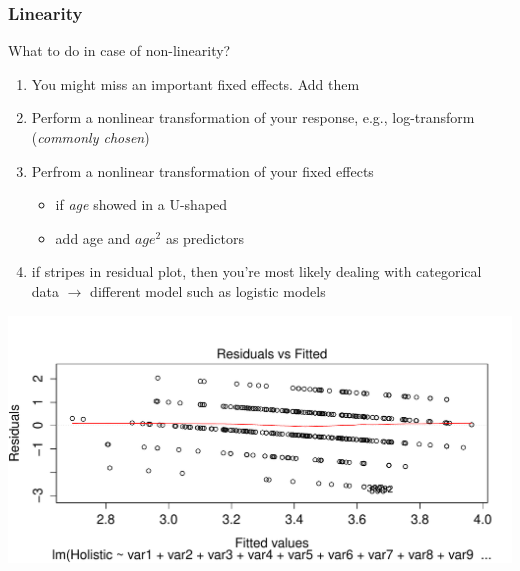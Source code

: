 \documentclass[10p]{beamer}\usepackage[]{graphicx}\usepackage[]{color}
\begin{document}
\begin{frame}
\frametitle{Linearity}
What to do in case of non-linearity?
\begin{enumerate}
\item You might miss an important fixed effects. Add them
\item Perform a \alert{nonlinear transformation} of your response, e.g., log-transform (\textit{commonly chosen})
\item Perfrom a nonlinear transformation of your fixed effects
	\begin{itemize}
	\item if \textit{age} showed in a U-shaped
	\item add age and $age^2$ as predictors
	\end{itemize}	
\item if stripes in residual plot, then you're most likely dealing with \alert{categorical data} $\rightarrow$ different model such as logistic models
\end{enumerate}
\begin{center}
\includegraphics[scale=.3]{figure/stripe}
\end{center}
\end{frame}
\end{document}
